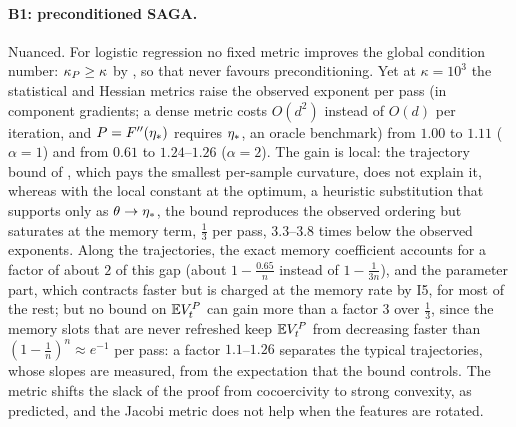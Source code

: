 \paragraph{B1: preconditioned SAGA.}
Nuanced. For logistic regression no fixed metric improves the global condition number: $\kappa_P\ge\kappa$ by
, so that  never favours preconditioning. Yet at $\kappa=10^3$ the
statistical and Hessian metrics raise the observed exponent per pass (in component gradients; a dense metric costs
$O(d^2)$ instead of $O(d)$ per iteration, and $P=F''(\eta_\ast)$ requires $\eta_\ast$, an oracle benchmark) from $1.00$
to $1.11$ ($\alpha=1$) and from $0.61$ to $1.24$--$1.26$ ($\alpha=2$). The gain is local: the trajectory bound of
, which pays the smallest per-sample curvature, does not explain it, whereas with the local
constant at the optimum, a heuristic substitution that  supports only as
$\theta\to\eta_\ast$, the bound reproduces the observed ordering but saturates at the memory term, $\frac13$ per pass,
$3.3$--$3.8$ times below the observed exponents. Along the trajectories, the exact memory coefficient accounts for a
factor of about $2$ of this gap (about
$1-\frac{0.65}n$ instead of $1-\frac1{3n}$), and the parameter part, which contracts faster but is charged at the memory
rate by I5, for most of the rest; but no bound on $\mathbb{E} V_t^P$ can gain more than a factor $3$ over $\frac13$, since the
memory slots that are never refreshed keep $\mathbb{E} V_t^P$ from decreasing faster than $(1-\frac1n)^n\approx e^{-1}$ per
pass: a factor $1.1$--$1.26$ separates the typical trajectories, whose slopes are measured, from the expectation that
the bound controls. The metric shifts the slack of the proof from cocoercivity to strong convexity, as predicted, and
the Jacobi metric does not help when the features are rotated.


